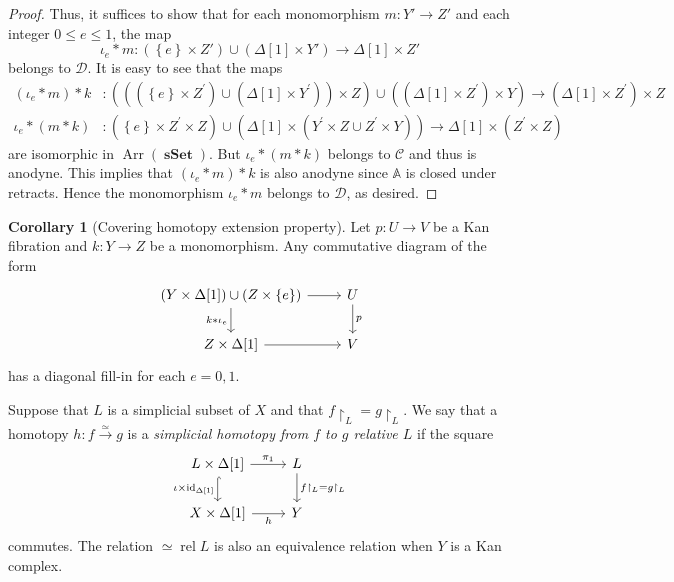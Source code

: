 \documentclass[10pt,letterpaper,cm]{nupset}
\theoremstyle{definition}
\theoremstyle{theorem}
\newtheorem{corollary}[definition]{Corollary}
\theoremstyle{remark}
\newcommand{\D}{\mathcal D}
\newcommand{\0}{\mathbf{0}}
\newcommand{\1}{\mathbf{1}}
\newcommand{\2}{\mathbf{2}}
\DeclareMathOperator{\sset}{\mathbf{sSet}}
\DeclareMathOperator{\Ar}{Arr}
\DeclareMathOperator{\idd}{id}
\DeclareMathOperator{\rel}{rel}
\begin{document}
\begin{proof}
Thus, it suffices to show that for each monomorphism $m : Y' \to Z'$ and each integer $0\leq e\leq 1$, the map $${\iota_e}\mathbin{\ast}{m} : \left(\left\{e\right\} \times Z'\right)\cup \left(\Delta[1]\times Y'\right) \to \Delta[1]\times Z'$$ belongs to $\D$. It is easy to see that the maps
\begin{align*}
\left(\iota_e \mathbin{\ast}m \right) \mathbin{\ast} k &:\left( \left(\left(\left\{e\right\} \times Z^{\prime}\right) \cup\left(\Delta[1] \times Y^{\prime}\right)\right) \times Z\right) \cup \left(\left(\Delta[1] \times Z^{\prime}\right) \times Y\right) \longrightarrow\left(\Delta[1] \times Z^{\prime}\right) \times Z
\\ 
\iota_e \mathbin{\ast} \left(m\mathbin{\ast}k\right)& : \left(\left\{e\right\} \times Z^{\prime} \times Z\right) \cup \left(\Delta[1] \times\left(Y^{\prime} \times Z \cup Z^{\prime} \times Y\right)\right) \longrightarrow \Delta[1] \times\left(Z^{\prime} \times Z\right)
\end{align*} are isomorphic in $\Ar(\sset)$. But $\iota_e \mathbin{\ast} \left(m\mathbin{\ast}k\right)$ belongs to $\mathcal{C}$ and thus is anodyne. This implies that $\left(\iota_e \mathbin{\ast}m \right) \mathbin{\ast} k$ is also anodyne since $\mathbb{A}$ is closed under retracts. Hence the monomorphism $\iota_e \mathbin{\ast}m$  belongs to $\D$, as desired.
\end{proof}


\begin{corollary}[Covering homotopy extension property]\label{chep}
Let $p : U \to V$ be a Kan fibration and $k: Y\to Z$ be a monomorphism. Any commutative diagram of the form
\[
\begin{tikzcd}
{\left(Y \times \Delta[1]\right)\cup \left(Z\times \left\{e\right\}\right)} \arrow[d, "k\mathbin{\ast}\iota_e"'] \arrow[r] & U \arrow[d, "p"] \\
{Z\times \Delta[1]} \arrow[r]                                                                                        & V               
\end{tikzcd}
\] has a diagonal fill-in for each $e=0,1$.
\end{corollary}

\medskip


   {\bigRelbar\bigRelbar{\bigtwoarrowsleft\rightarrow\rightarrow}}

Suppose that $L$ is a simplicial subset of $X$ and that $f\restriction_L = g\restriction_L$.  We say that a homotopy $h: f\overset{\simeq}{\longrightarrow} g$ is a \textit{simplicial homotopy from $f$ to $g$ relative $L$} if the square
\[
\begin{tikzcd}
L\times \Delta[1] \arrow[r, "\pi_1"] \arrow[d, hook, "\iota\times \idd_{\Delta[1]}"'] & L \arrow[d, "f\restriction_L=g\restriction_L"] \\
X\times \Delta[1] \arrow[r, "h"']                                & Y                                             
\end{tikzcd}
\] commutes.  The relation ${}\simeq{}\rel{L}$ is also an equivalence relation when $Y$ is a Kan complex.
\end{document}

